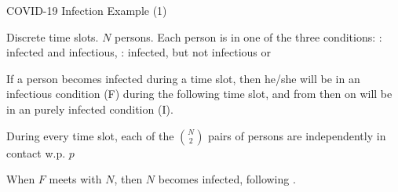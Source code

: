 \begin{frame}{COVID-19 Infection Example (1)}

\plitemsep 0.1in

\bci 
\item<1-> Discrete time slots. $N$ persons. 
  Each person is in one of the three conditions:
  : infected and infectious, : infected, but not infectious or 

  \bci
\item<2->  If a person becomes infected during a time slot, then he/she
  will be in an infectious condition (F) during the following time slot, and from then
  on will be in an purely infected condition (I).

 \eci

\item<3->  During every time slot, each of the $N \choose 2$ pairs of
  persons are independently in contact w.p. $p$
  \bci
\item<4-> When $F$ meets with $N$, then $N$ becomes infected, following . 

  \eci

  

  \eci
\end{frame}



